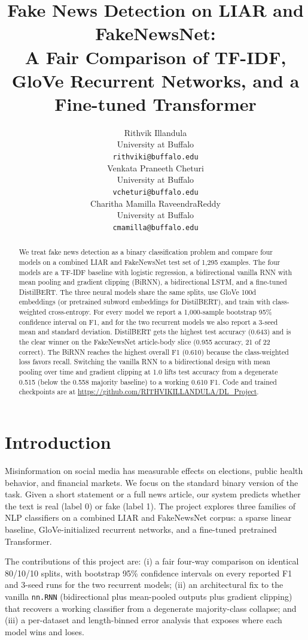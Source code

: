 \documentclass{article}
\title{Fake News Detection on LIAR and FakeNewsNet:\\A Fair Comparison of TF-IDF, GloVe Recurrent Networks, and a Fine-tuned Transformer}
\author{%
  Rithvik Illandula \\
  University at Buffalo\\
  \texttt{rithviki@buffalo.edu} \\
  \And
  Venkata Praneeth Cheturi \\
  University at Buffalo\\
  \texttt{vcheturi@buffalo.edu} \\
  \And
  Charitha Mamilla RaveendraReddy \\
  University at Buffalo\\
  \texttt{cmamilla@buffalo.edu} \\
}
\begin{document}
\maketitle


\begin{abstract}
We treat fake news detection as a binary classification problem and compare four models on a combined LIAR and FakeNewsNet test set of 1,295 examples. The four models are a TF-IDF baseline with logistic regression, a bidirectional vanilla RNN with mean pooling and gradient clipping (BiRNN), a bidirectional LSTM, and a fine-tuned DistilBERT. The three neural models share the same splits, use GloVe 100d embeddings (or pretrained subword embeddings for DistilBERT), and train with class-weighted cross-entropy. For every model we report a 1,000-sample bootstrap 95\% confidence interval on F1, and for the two recurrent models we also report a 3-seed mean and standard deviation. DistilBERT gets the highest test accuracy (0.643) and is the clear winner on the FakeNewsNet article-body slice (0.955 accuracy, 21 of 22 correct). The BiRNN reaches the highest overall F1 (0.610) because the class-weighted loss favors recall. Switching the vanilla RNN to a bidirectional design with mean pooling over time and gradient clipping at 1.0 lifts test accuracy from a degenerate 0.515 (below the 0.558 majority baseline) to a working 0.610 F1. Code and trained checkpoints are at \url{https://github.com/RITHVIKILLANDULA/DL_Project}.
\end{abstract}

\section{Introduction}

Misinformation on social media has measurable effects on elections, public health behavior, and financial markets. We focus on the standard binary version of the task. Given a short statement or a full news article, our system predicts whether the text is real (label 0) or fake (label 1). The project explores three families of NLP classifiers on a combined LIAR and FakeNewsNet corpus: a sparse linear baseline, GloVe-initialized recurrent networks, and a fine-tuned pretrained Transformer.

The contributions of this project are: (i) a fair four-way comparison on identical 80/10/10 splits, with bootstrap 95\% confidence intervals on every reported F1 and 3-seed runs for the two recurrent models; (ii) an architectural fix to the vanilla \texttt{nn.RNN} (bidirectional plus mean-pooled outputs plus gradient clipping) that recovers a working classifier from a degenerate majority-class collapse; and (iii) a per-dataset and length-binned error analysis that exposes where each model wins and loses.
\end{document}
